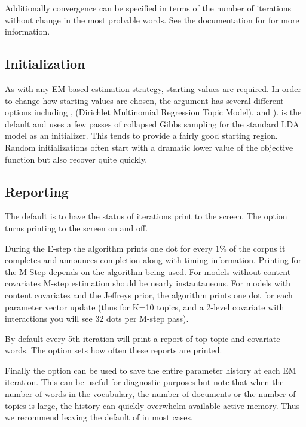\documentclass[nojss]{jss}
\begin{document}
Additionally convergence can be specified in terms of the number of iterations without change in the most probable words.  See the documentation for  for more information.

\subsection{Initialization}

As with any EM based estimation strategy, starting values are required. In order to change how starting values are chosen, the argument  has several different options including ,  (Dirichlet Multinomial Regression Topic Model), and ).
 is the default and uses a few passes of collapsed Gibbs sampling for the standard LDA model as an initializer.  This tends to provide a fairly good starting region.  Random initializations often start with a dramatic lower value of the objective function but also recover quite quickly.

\subsection{Reporting}
The default is to have the status of iterations print to the screen. The  option turns printing to the screen on and off.

During the E-step the algorithm prints one dot for every $1\%$ of the corpus it completes and announces completion along with timing information.  Printing for the M-Step depends on the algorithm being used.  For models without content covariates M-step estimation should be nearly instantaneous.  For models with content covariates and the Jeffreys prior, the algorithm prints one dot for each parameter vector update (thus for K=10 topics, and a 2-level covariate with interactions you will see 32 dots per M-step pass).

By default every 5th iteration will print a report of top topic and covariate words.  The  option sets how often these reports are printed.

Finally the  option can be used to save the entire parameter history at each EM iteration.  This can be useful for diagnostic purposes but note that when the number of words in the vocabulary, the number of documents or the number of topics is large, the history can quickly overwhelm available active memory. Thus we recommend leaving the default of  in most cases.
\end{document}

